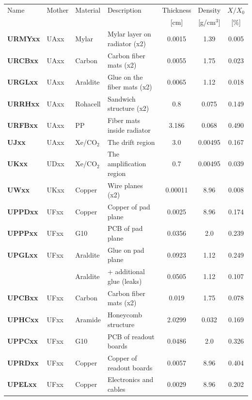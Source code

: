 \documentclass{alicetdr}
\begin{document}
\begin{center}
\begin{tabular}{l|l|l|l|c|c|c}
Name         & Mother & Material    & Description                  & Thickness & Density      & $X/X_{0}$ \\ 
             &        &             &                              & [cm]      & [g/cm$^{3}$] & [\%]      \\ \hline
{\bf URMYxx} & UAxx   & Mylar       & Mylar layer on radiator (x2) & 0.0015    & 1.39         & 0.005     \\
{\bf URCBxx} & UAxx   & Carbon      & Carbon fiber mats (x2)       & 0.0055    & 1.75         & 0.023     \\
{\bf URGLxx} & UAxx   & Araldite    & Glue on the fiber mats (x2)  & 0.0065    & 1.12         & 0.018     \\
{\bf URRHxx} & UAxx   & Rohacell    & Sandwich structure (x2)      & 0.8       & 0.075        & 0.149     \\
{\bf URFBxx} & UAxx   & PP          & Fiber mats inside radiator   & 3.186     & 0.068        & 0.490     \\ \hline
{\bf UJxx}   & UAxx   & Xe/CO$_{2}$ & The drift region             & 3.0       & 0.00495      & 0.167     \\ 
{\bf UKxx}   & UDxx   & Xe/CO$_{2}$ & The amplification region     & 0.7       & 0.00495      & 0.039     \\ 
{\bf UWxx}   & UKxx   & Copper      & Wire planes (x2)             & 0.00011   & 8.96         & 0.008     \\ \hline
{\bf UPPDxx} & UFxx   & Copper      & Copper of pad plane          & 0.0025    & 8.96         & 0.174     \\
{\bf UPPPxx} & UFxx   & G10         & PCB of pad plane             & 0.0356    & 2.0          & 0.239     \\
{\bf UPGLxx} & UFxx   & Araldite    & Glue on pad plane            & 0.0923    & 1.12         & 0.249     \\
             &        & Araldite    & + additional glue (leaks)    & 0.0505    & 1.12         & 0.107     \\
{\bf UPCBxx} & UFxx   & Carbon      & Carbon fiber mats (x2)       & 0.019     & 1.75         & 0.078     \\
{\bf UPHCxx} & UFxx   & Aramide     & Honeycomb structure          & 2.0299    & 0.032        & 0.169     \\
{\bf UPPCxx} & UFxx   & G10         & PCB of readout boards        & 0.0486    & 2.0          & 0.326     \\
{\bf UPRDxx} & UFxx   & Copper      & Copper of readout boards     & 0.0057    & 8.96         & 0.404     \\
{\bf UPELxx} & UFxx   & Copper      & Electronics and cables       & 0.0029    & 8.96         & 0.202     \\
\end{tabular}
\end{center}
\end{document}
